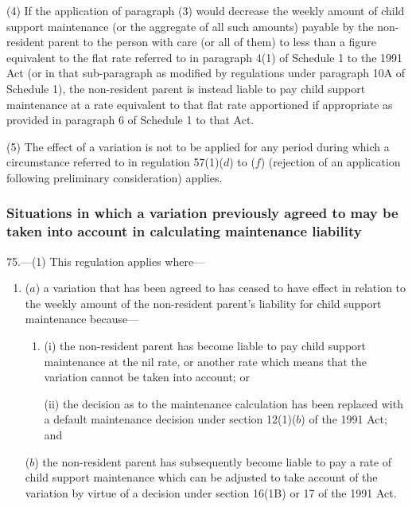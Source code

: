 \documentclass[12pt,a4paper]{article}
\begin{document}
(4) If the application of paragraph (3) would decrease the weekly amount of child support maintenance (or the aggregate of all such amounts) payable by the non-resident parent to the person with care (or all of them) to less than a figure equivalent to the flat rate referred to in paragraph 4(1) of Schedule 1 to the 1991 Act (or in that sub-paragraph as modified by regulations under paragraph 10A of Schedule 1), the non-resident parent is instead liable to pay child support maintenance at a rate equivalent to that flat rate apportioned if appropriate as provided in paragraph 6 of Schedule 1 to that Act.

(5) The effect of a variation is not to be applied for any period during which a circumstance referred to in regulation 57(1)($d$)  to ($f$)  (rejection of an application following preliminary consideration) applies.


\subsubsection[75. Situations in which a variation previously agreed to may be taken into account in calculating maintenance liability]{Situations in which a variation previously agreed to may be taken into account in calculating maintenance liability}

75.---(1)  This regulation applies where—
\begin{enumerate}\item[]
($a$) a variation that has been agreed to has ceased to have effect in relation to the weekly amount of the non-resident parent’s liability for child support maintenance because—
\begin{enumerate}\item[]
(i) the non-resident parent has become liable to pay child support maintenance at the nil rate, or another rate which means that the variation cannot be taken into account; or

(ii) the decision as to the maintenance calculation has been replaced with a default maintenance decision under section 12(1)($b$)  of the 1991 Act; and
\end{enumerate}

($b$) the non-resident parent has subsequently become liable to pay a rate of child support maintenance which can be adjusted to take account of the variation by virtue of a decision under section 16(1B) or 17 of the 1991 Act.
\end{enumerate}
\end{document}
